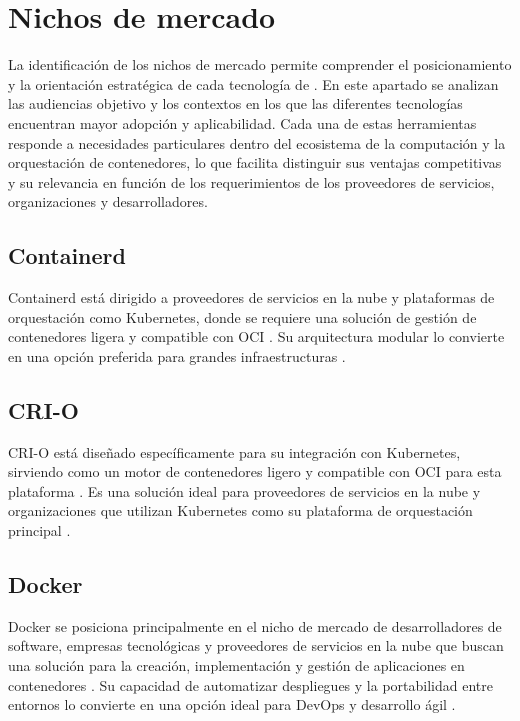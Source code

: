 \section{Nichos de mercado}
\noindent
La identificación de los nichos de mercado permite comprender el posicionamiento y la orientación estratégica de cada tecnología de \VBC. En este apartado se analizan las audiencias objetivo y los contextos en los que las diferentes tecnologías encuentran mayor adopción y aplicabilidad. Cada una de estas herramientas responde a necesidades particulares dentro del ecosistema de la computación y la orquestación de contenedores, lo que facilita distinguir sus ventajas competitivas y su relevancia en función de los requerimientos de los proveedores de servicios, organizaciones y desarrolladores.
\subsection{Containerd}
\noindent
Containerd está dirigido a proveedores de servicios en la nube y plataformas de orquestación como Kubernetes, donde se requiere una solución de gestión de contenedores ligera y compatible con OCI \citep{Vano2023}. Su arquitectura modular lo convierte en una opción preferida para grandes infraestructuras \citep{Zhou2021}.

\subsection{CRI-O}
\noindent
CRI-O está diseñado específicamente para su integración con Kubernetes, sirviendo como un motor de contenedores ligero y compatible con OCI para esta plataforma \citep{CNCF2019}. Es una solución ideal para proveedores de servicios en la nube y organizaciones que utilizan Kubernetes como su plataforma de orquestación principal \citep{151962df5f7e4b9faba0629540c11439}.

\subsection{Docker}
\noindent
Docker se posiciona principalmente en el nicho de mercado de desarrolladores de software, empresas tecnológicas y proveedores de servicios en la nube que buscan una solución para la creación, implementación y gestión de aplicaciones en contenedores \citep{Hill2025}. Su capacidad de automatizar despliegues y la portabilidad entre entornos lo convierte en una opción ideal para DevOps y desarrollo ágil \citep{Mag2025}.

